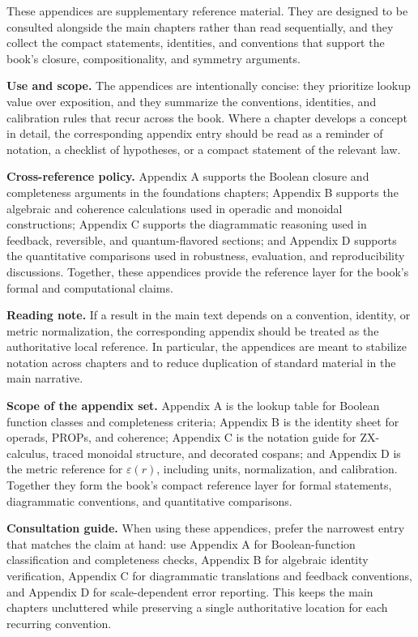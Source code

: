 These appendices are supplementary reference material. They are designed to be consulted alongside the main chapters rather than read sequentially, and they collect the compact statements, identities, and conventions that support the book's closure, compositionality, and symmetry arguments.

\medskip
\noindent\textbf{Use and scope.} The appendices are intentionally concise: they prioritize lookup value over exposition, and they summarize the conventions, identities, and calibration rules that recur across the book. Where a chapter develops a concept in detail, the corresponding appendix entry should be read as a reminder of notation, a checklist of hypotheses, or a compact statement of the relevant law.

\medskip
\noindent\textbf{Cross-reference policy.} Appendix A supports the Boolean closure and completeness arguments in the foundations chapters; Appendix B supports the algebraic and coherence calculations used in operadic and monoidal constructions; Appendix C supports the diagrammatic reasoning used in feedback, reversible, and quantum-flavored sections; and Appendix D supports the quantitative comparisons used in robustness, evaluation, and reproducibility discussions. Together, these appendices provide the reference layer for the book's formal and computational claims.

\medskip
\noindent\textbf{Reading note.} If a result in the main text depends on a convention, identity, or metric normalization, the corresponding appendix should be treated as the authoritative local reference. In particular, the appendices are meant to stabilize notation across chapters and to reduce duplication of standard material in the main narrative.

\medskip
\noindent\textbf{Scope of the appendix set.} Appendix A is the lookup table for Boolean function classes and completeness criteria; Appendix B is the identity sheet for operads, PROPs, and coherence; Appendix C is the notation guide for ZX-calculus, traced monoidal structure, and decorated cospans; and Appendix D is the metric reference for \(\varepsilon(r)\), including units, normalization, and calibration. Together they form the book's compact reference layer for formal statements, diagrammatic conventions, and quantitative comparisons.

\medskip
\noindent\textbf{Consultation guide.} When using these appendices, prefer the narrowest entry that matches the claim at hand: use Appendix A for Boolean-function classification and completeness checks, Appendix B for algebraic identity verification, Appendix C for diagrammatic translations and feedback conventions, and Appendix D for scale-dependent error reporting. This keeps the main chapters uncluttered while preserving a single authoritative location for each recurring convention.
